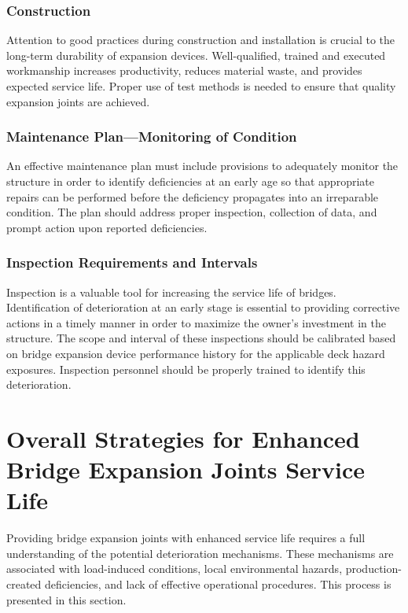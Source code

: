 \subsubsection{Construction}
Attention to good practices during construction and installation is crucial to the long-term durability of expansion
devices. Well-qualified, trained and executed workmanship increases productivity, reduces material waste, and
provides expected service life. Proper use of test methods is needed to ensure that quality expansion joints are
achieved.

\subsubsection{Maintenance Plan—Monitoring of Condition}
An effective maintenance plan must include provisions to adequately monitor the structure in order to identify
deficiencies at an early age so that appropriate repairs can be performed before the deficiency propagates into an
irreparable condition. The plan should address proper inspection, collection of data, and prompt action upon reported
deficiencies.

\subsubsection{Inspection Requirements and Intervals}
Inspection is a valuable tool for increasing the service life of bridges. Identification of deterioration at an early
stage is essential to providing corrective actions in a timely manner in order to maximize the owner’s investment in
the structure. The scope and interval of these inspections should be calibrated based on bridge expansion device
performance history for the applicable deck hazard exposures. Inspection personnel should be properly trained to
identify this deterioration.

\section{Overall Strategies for Enhanced Bridge Expansion Joints Service Life}\label{sec:strategy-joints-life}
Providing bridge expansion joints with enhanced service life requires a full understanding of the potential
deterioration mechanisms. These mechanisms are associated with load-induced conditions, local environmental
hazards, production-created deficiencies, and lack of effective operational procedures. This process is presented in
this section.

